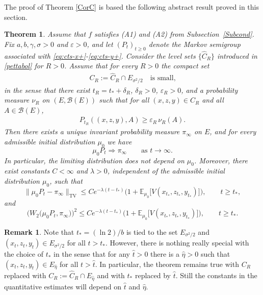 \documentclass[11pt, a4paper,leqno]{amsart}
\newtheorem{theorem}{Theorem}[section]
\theoremstyle{definition}
\newtheorem{remark}{Remark}[section]
\numberwithin{equation}{section}
\begin{document}
The proof of  Theorem \ref{CorC} is based the following abstract result proved in this section.
\begin{theorem}\label{Thm3-revised-}
Assume that $f$ satisfies \textnormal{(A1)} and \textnormal{(A2)} from Subsection~\ref{Subcond}. Fix $a,b,\gamma,\sigma>0$ and $\varepsilon>0$,
and let $(P_t)_{t\ge0}$ denote the Markov semigroup associated with
\eqref{eq:cts-x+}-\eqref{eq:cts-y+}. Consider the level sets $\{\hat C_R\}$ introduced in \eqref{pettabol} for $R>0$. Assume that for every $R>0$ the compact set
\begin{align}\label{petta}
C_R :=\hat C_R\cap E_{\sigma^2/2}\quad\mbox{is small,}
\end{align}
in the sense that there exist $t_R= t_\ast+\delta_R$, $\delta_R> 0$,  $\varepsilon_R > 0$, and a probability measure $\nu_R$
on $(E,\mathcal B(E))$ such that for all $(x,z,y) \in C_R$ and all
$A \in \mathcal B(E)$,
\begin{align}\label{petta-rep}
P_{t_R}((x,z,y),A) \ge \varepsilon_R\,\nu_R(A).
\end{align}
Then there exists a unique invariant probability measure $\pi_\infty$ on $E$, and for every admissible initial distribution $\mu_0$ we have
\[
\mu_0 P_t \Rightarrow \pi_\infty
\qquad \text{as } t\to\infty .
\]
In particular, the limiting distribution does not depend on $\mu_0$. Moreover, there exist constants $C<\infty$ and $\lambda>0$, independent of the admissible initial distribution $\mu_0$, such that
\begin{equation}\label{eq:V-geometric-ergodicity-revised}
\|\mu_0P_t-\pi_\infty\|_{\mathrm{TV}}
\le
C e^{-\lambda (t-t_\ast)}
\bigl(1+\mathbb{E}_{\mu_0}\!\big[V(x_{t_\ast},z_{t_\ast},y_{t_\ast})\big]\bigr),
\qquad t\ge t_\ast,
\end{equation}
and
\begin{equation}\label{eq:W2-erg-revised}
\bigl (W_2\bigl(\mu_0P_t,\pi_\infty\bigr)\bigr )^2
\le
C e^{-\lambda (t-t_\ast)}
\bigl(1+\mathbb{E}_{\mu_0}\!\big[V(x_{t_\ast},z_{t_\ast},y_{t_\ast})\big]\bigr),
\qquad t\ge t_\ast.
\end{equation}
\end{theorem}
\begin{remark} Note that $t_\ast=(\ln 2)/b$ is tied to the set $E_{\sigma^2/2}$ and $(x_t,z_t,y_t)\in E_{\sigma^2/2}$ for all $t>t_\ast$. However, there is nothing really special with the choice of $t_\ast$ in the sense that for any $\hat t>0$ there is a $\hat\eta>0$ such that $(x_t,z_t,y_t)\in E_{\hat \eta}$ for all $t>\hat t$. In particular, the theorem remains true with $C_R$ replaced with $C_R:=\hat C_R\cap E_{\hat\eta}$ and with $t_\ast$ replaced by $\hat t$. Still the constants in the quantitative estimates will depend on $\hat t$ and $\hat\eta$.
\end{remark}
\end{document}
